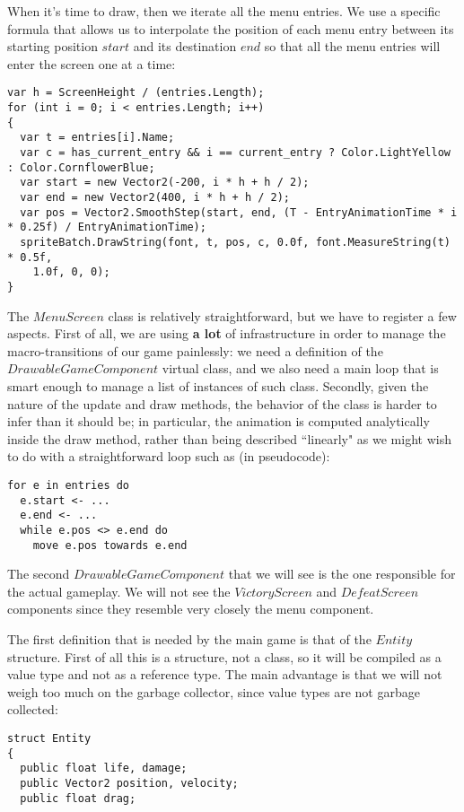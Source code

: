 When it's time to draw, then we iterate all the menu entries. We use a specific formula that allows us to interpolate the position of each menu entry between its starting position $start$ and its destination $end$ so that all the menu entries will enter the screen one at a time:
\begin{lstlisting}
var h = ScreenHeight / (entries.Length);
for (int i = 0; i < entries.Length; i++)
{
  var t = entries[i].Name;
  var c = has_current_entry && i == current_entry ? Color.LightYellow : Color.CornflowerBlue;
  var start = new Vector2(-200, i * h + h / 2);
  var end = new Vector2(400, i * h + h / 2);
  var pos = Vector2.SmoothStep(start, end, (T - EntryAnimationTime * i * 0.25f) / EntryAnimationTime);
  spriteBatch.DrawString(font, t, pos, c, 0.0f, font.MeasureString(t) * 0.5f,
    1.0f, 0, 0);
}
\end{lstlisting}

The $MenuScreen$ class is relatively straightforward, but we have to register a few aspects. First of all, we are using \textbf{a lot} of infrastructure in order to manage the macro-transitions of our game painlessly: we need a definition of the $DrawableGameComponent$ virtual class, and we also need a main loop that is smart enough to manage a list of instances of such class. Secondly, given the nature of the update and draw methods, the behavior of the class is harder to infer than it should be; in particular, the animation is computed analytically inside the draw method, rather than being described ``linearly" as we might wish to do with a straightforward loop such as (in pseudocode):
\begin{lstlisting}
for e in entries do
  e.start <- ...
  e.end <- ...
  while e.pos <> e.end do
    move e.pos towards e.end
\end{lstlisting}

The second $DrawableGameComponent$ that we will see is the one responsible for the actual gameplay. We will not see the $VictoryScreen$ and $DefeatScreen$ components since they resemble very closely the menu component.

The first definition that is needed by the main game is that of the $Entity$ structure. First of all this is a structure, not a class, so it will be compiled as a value type and not as a reference type. The main advantage is that we will not weigh too much on the garbage collector, since value types are not garbage collected:
\begin{lstlisting}
struct Entity
{
  public float life, damage;
  public Vector2 position, velocity;
  public float drag;
\end{lstlisting}

